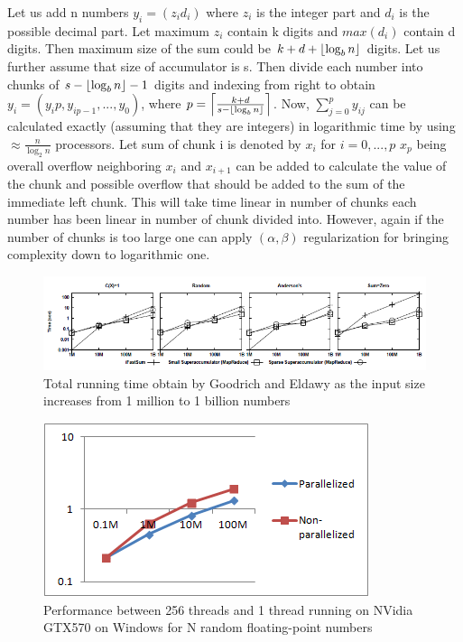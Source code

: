 \documentclass[11pt]{article}       %
\DeclarePairedDelimiter{\ceil}{\lceil}{\rceil}
\DeclarePairedDelimiter{\floor}{\lfloor}{\rfloor}
\begin{document}
Let us add n numbers $y_i = (z_i d_i)$ where $z_i$ is the integer part and $d_i$ is the possible decimal part. Let maximum ${z_i}$ contain k digits and $max(d_i)$ contain d digits. Then maximum size of the sum could be $k + d + \floor*{\log_b {n}}$ digits. Let us further assume that size of accumulator is s. Then divide each number into chunks of $s - \floor*{\log_b {n}} - 1$ digits and indexing from right to obtain $y_i =(y_ip, y_{ip-1},..., y_0)$, where $p=\ceil*{\frac{k+d}{s- \floor*{\log_b {n}}}}$. Now, $\sum\limits_{j=0}^{p}y_{ij}$ can be calculated exactly (assuming that they are integers) in logarithmic time by using $\approx \frac{n}{\log_2 {n}}$ processors. 
Let sum of chunk i is denoted by $x_i$ for $i=0,...,p$ $x_p$ being overall overflow neighboring $x_i$ and $x_{i+1}$ can be added to calculate the value of the chunk and possible overflow that should be added to the sum of the immediate left chunk. This will take time linear in number of chunks each number has been linear in number of chunk divided into. However, again if the number of chunks is too large one can apply $(\alpha, \beta)$ regularization for bringing complexity down to logarithmic one.


\begin{figure}[h]
\centering
\includegraphics[width=\linewidth]{goodrich_performance}
{\footnotesize \par}
\caption{Total running time obtain by Goodrich and Eldawy \cite{PASFPN} as the input size increases from 1 million to 1 billion numbers}
\end{figure}

\begin{figure}[h]
\centering
\begin{minipage}{0.60\textwidth} %
\includegraphics[width=\linewidth]{performance}
{\footnotesize \par}
\end{minipage}
\caption{Performance between 256 threads and 1 thread running on NVidia GTX570 on Windows for N random floating-point numbers}
\end{figure}
\end{document}
